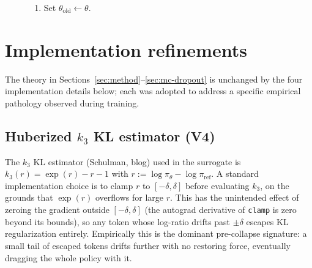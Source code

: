 \documentclass[11pt]{article}
\theoremstyle{definition}
\theoremstyle{remark}
\newcommand{\Loss}{\mathcal{L}}
\newcommand{\eps}{\varepsilon}
\newcommand{\old}{\mathrm{old}}
\begin{document}
\begin{figure}[h]
{\begin{minipage}{0.92\linewidth}
\begin{enumerate}[topsep=2pt,itemsep=1pt,leftmargin=*]
\begin{enumerate}[topsep=1pt,itemsep=1pt,label=\alph*.]
        $\rho^{(k)} = \pi_\theta/\pi_{\theta_\old}$, take a gradient
        step on the loss
        \begin{equation*}
        \Loss(\theta) \;=\;
          -\,\tfrac{1}{K_{\mathrm{kept}}}\!\sum_{k\,\mathrm{kept}}\!
            \tfrac{1}{|y^{(k)}|}\!\sum_{\ell}
            \min\!\big(\rho_\ell^{(k)} A^{(k)},\,
              \mathrm{clip}(\rho_\ell^{(k)},1\pm\eps) A^{(k)}\big)
          \;+\; \beta(t)\,\tilde k_3(r^{\mathrm{ref}})
        \end{equation*}
        where the per-rollout token sum is divided by the rollout
        length (V6, sequence-mean), $\beta(t) = \beta_0\,\eta_t/\eta_{\max}$
        anneals with the lr schedule (V5), and $\tilde k_3$ is the
        Huberized $k_3$ KL estimator of~\eqref{eq:huber-kl} below (V4).
  \item Set $\theta_\old \gets \theta$.
  \end{enumerate}
\end{enumerate}
\end{minipage}}
\label{alg:dropout-grpo}
\end{figure}

\section{Implementation refinements}
\label{sec:impl}

The theory in Sections~\ref{sec:method}--\ref{sec:mc-dropout} is unchanged
by the four implementation details below; each was adopted to address a
specific empirical pathology observed during training.

\subsection{Huberized $k_3$ KL estimator (V4)}

The $k_3$ KL estimator (Schulman, blog) used in the surrogate is
$k_3(r) = \exp(r) - r - 1$ with $r := \log\pi_\theta - \log\pi_{\mathrm{ref}}$.
A standard implementation choice is to clamp $r$ to $[-\delta, \delta]$
before evaluating $k_3$, on the grounds that $\exp(r)$ overflows for large
$r$.  This has the unintended effect of zeroing the gradient outside
$[-\delta, \delta]$ (the autograd derivative of \texttt{clamp} is zero
beyond its bounds), so any token whose log-ratio drifts past $\pm\delta$
escapes KL regularization entirely.  Empirically this is the dominant
pre-collapse signature: a small tail of escaped tokens drifts further with
no restoring force, eventually dragging the whole policy with it.
\end{document}
